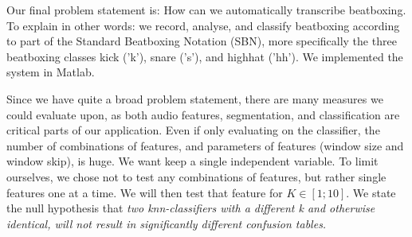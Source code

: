 Our final problem statement is: How can we automatically transcribe beatboxing. To explain in other words: we record, analyse, and classify beatboxing according to part of the Standard Beatboxing Notation (SBN), more specifically the three beatboxing classes kick ('k'), snare ('s'), and highhat ('hh'). We implemented the system in Matlab.


Since we have quite a broad problem statement, there are many measures we could evaluate upon, as both audio features, segmentation, and classification are critical parts of our application. Even if only evaluating on the classifier, the number of combinations of features, and parameters of features (window size and window skip), is huge. We want keep a single independent variable. To limit ourselves, we chose not to test any combinations of features, but rather single features one at a time. We will then test that feature for $K \in [1;10]$. We state the null hypothesis that \emph{two knn-classifiers with a different k and otherwise identical, will not result in significantly different confusion tables.}


